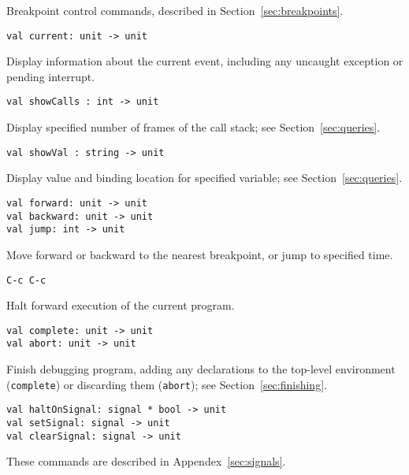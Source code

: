 Breakpoint control commands, described in Section~\ref{sec:breakpoints}.

\begin{verbatim}
val current: unit -> unit
\end{verbatim}

Display information about the current event, including any uncaught 
exception or pending interrupt.

\begin{verbatim}
val showCalls : int -> unit
\end{verbatim}

Display specified number of frames of the call stack; 
see Section~\ref{sec:queries}.

\begin{verbatim}
val showVal : string -> unit
\end{verbatim}

Display value and binding location for specified variable; see
Section~\ref{sec:queries}.

\begin{verbatim}
val forward: unit -> unit
val backward: unit -> unit
val jump: int -> unit
\end{verbatim}

Move forward or backward to the nearest breakpoint, or jump to specified time.

\begin{verbatim}
C-c C-c
\end{verbatim}

Halt forward execution of the current program.

\begin{verbatim}
val complete: unit -> unit
val abort: unit -> unit
\end{verbatim}

Finish debugging program, adding any declarations to the top-level
environment (\verb'complete') or discarding them (\verb'abort'); see
Section~\ref{sec:finishing}.

\begin{verbatim}
val haltOnSignal: signal * bool -> unit
val setSignal: signal -> unit
val clearSignal: signal -> unit
\end{verbatim}

These commands are described in Appendex~\ref{sec:signals}.

